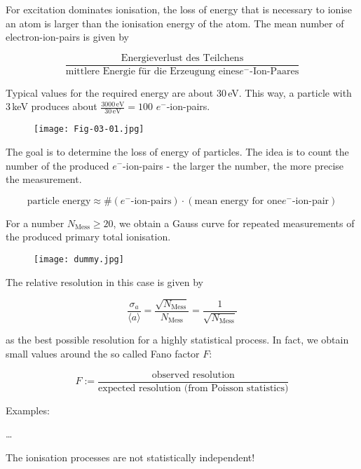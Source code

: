 For excitation dominates ionisation, the loss of energy that is necessary to ionise an atom is
larger than the ionisation energy of the atom. The mean number of electron-ion-pairs is given by 

\[\frac{\text{Energieverlust des Teilchens}}{\text{mittlere Energie für die Erzeugung eines
$e^-$-Ion-Paares}} \]

Typical values for the required energy are about $30\,$eV. This way, a particle with $3\,$keV
produces about $\frac{3000\,\text{eV}}{30\,\text{eV}}=100$ $e^-$-ion-pairs.

\begin{figure}[H]
	\centering
	\texttt{[image: Fig-03-01.jpg]}
\end{figure}

The goal is to determine the loss of energy of particles. The idea is to count the number of the
produced $e^-$-ion-pairs - the larger the number, the more precise the measurement. 

\[\text{particle energy}\approx \#(\text{$e^-$-ion-pairs})\cdot (\text{mean energy for one
$e^-$-ion-pair})\]

For a number $N_{\text{Mess}}\ge 20$, we obtain a Gauss curve for repeated measurements of the
produced primary total ionisation.

\begin{figure}[H]
	\centering
	\texttt{[image: dummy.jpg]}
\end{figure}

The relative resolution in this case is given by

\[\frac{\sigma_{a}}{\langle a \rangle} =
\frac{\sqrt{N_{\text{Mess}}}}{N_{\text{Mess}}}=\frac{1}{\sqrt{N_{\text{Mess}}}}
\]

as the best possible resolution for a highly statistical process. In fact, we obtain small values
around the so called Fano factor $F$:

\[ F:=\frac{\text{observed resolution}}{\text{expected resolution (from Poisson statistics)}} \]

Examples:

\ldots

The ionisation processes are not statistically independent!
